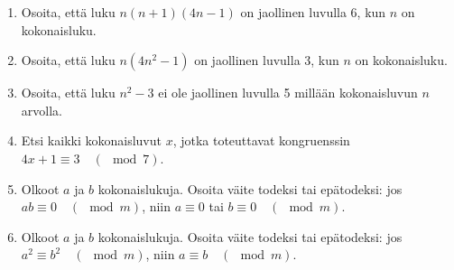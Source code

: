 \begin{enumerate}
\item Osoita, että luku $n(n + 1)(4n - 1)$ on jaollinen luvulla 6, kun $n$ on kokonaisluku.

\item Osoita, että luku $n(4n^2 - 1)$ on jaollinen luvulla 3, kun $n$ on kokonaisluku.

\item Osoita, että luku $n^2 - 3$ ei ole jaollinen luvulla 5 millään kokonaisluvun $n$ arvolla.

\item
Etsi kaikki kokonaisluvut $x$, jotka toteuttavat kongruenssin $4x+1\equiv 3\quad (\mod 7)$.

\item
Olkoot $a$ ja $b$ kokonaislukuja. Osoita väite todeksi tai epätodeksi: jos $ab \equiv 0 \quad (\mod m)$, niin $a \equiv 0$ tai $b\equiv 0 \quad (\mod m)$.

\item
Olkoot $a$ ja $b$ kokonaislukuja. Osoita väite todeksi tai epätodeksi: jos $a^2 \equiv b^2 \quad (\mod m)$, niin $a \equiv b \quad (\mod m)$.


\end{enumerate}
